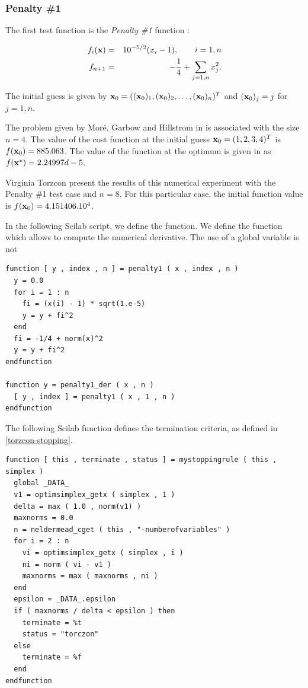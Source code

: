 \subsubsection{Penalty \#1}
The first test function is the \emph{Penalty \#1} function :

\begin{eqnarray}
\label{torzcon-sumofsquares-case1}
f_i(\mathbf{x}) &=& 10^{-5/2} (x_i - 1) , \qquad i=1,n\\
f_{n+1} & = & -\frac{1}{4} + \sum_{j=1,n} x_j^2.
\end{eqnarray}

The initial guess is given by $\mathbf{x}_0 = ((\mathbf{x}_0)_1 , (\mathbf{x}_0)_2, \ldots , (\mathbf{x}_0)_n)^T$ and 
$(\mathbf{x}_0)_j = j$ for $j=1,n$. 

The problem given by Mor\'e, Garbow and Hillstrom in \cite{355943,355936} is associated with 
the size $n=4$. The value of the cost function at the initial guess 
$\mathbf{x}_0 = (1,2,3,4)^T$ is $f(\mathbf{x}_0) = 885.063$. The value of the function
at the optimum is given in \cite{355943,355936} as $f(\mathbf{x}^\star) = 2.24997d-5$.

Virginia Torzcon present the results of this numerical experiment with the Penalty \#1 test case and $n=8$.
For this particular case, the initial function value is $f(\mathbf{x}_0) = 4.151406.10^4$.

In the following Scilab script, we define the  function. 
We define the function  which allows to compute the 
numerical derivative.
The use of a global variable is not 

\lstset{language=scilabscript}
\begin{lstlisting}
function [ y , index , n ] = penalty1 ( x , index , n )
  y = 0.0
  for i = 1 : n
    fi = (x(i) - 1) * sqrt(1.e-5)
    y = y + fi^2
  end
  fi = -1/4 + norm(x)^2
  y = y + fi^2
endfunction

function y = penalty1_der ( x , n )
  [ y , index ] = penalty1 ( x , 1 , n )
endfunction
\end{lstlisting}

The following Scilab function defines the termination criteria, as 
defined in \ref{torzcon-stopping}.

\lstset{language=scilabscript}
\begin{lstlisting}
function [ this , terminate , status ] = mystoppingrule ( this , simplex )
  global _DATA_
  v1 = optimsimplex_getx ( simplex , 1 )
  delta = max ( 1.0 , norm(v1) )
  maxnorms = 0.0
  n = neldermead_cget ( this , "-numberofvariables" )
  for i = 2 : n
    vi = optimsimplex_getx ( simplex , i )
    ni = norm ( vi - v1 )
    maxnorms = max ( maxnorms , ni )
  end
  epsilon = _DATA_.epsilon
  if ( maxnorms / delta < epsilon ) then
    terminate = %t
    status = "torczon"
  else
    terminate = %f
  end
endfunction
\end{lstlisting}

